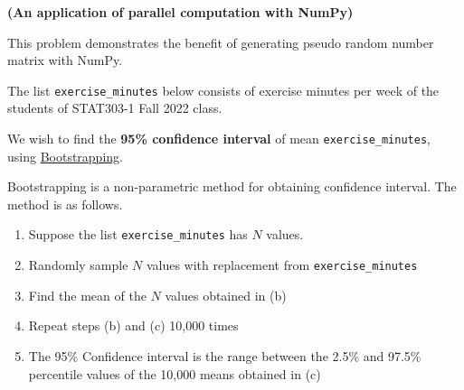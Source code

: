 \documentclass[
  letterpaper,
  DIV=11,
  numbers=noendperiod]{scrreprt}
\begin{document}
\textbf{(An application of parallel computation with NumPy)}

This problem demonstrates the benefit of generating pseudo random number
matrix with NumPy.

The list \texttt{exercise\_minutes} below consists of exercise minutes
per week of the students of STAT303-1 Fall 2022 class.

We wish to find the \textbf{95\% confidence interval} of mean
\texttt{exercise\_minutes}, using
\href{https://en.wikipedia.org/wiki/Bootstrapping_(statistics)}{Bootstrapping}.

Bootstrapping is a non-parametric method for obtaining confidence
interval. The method is as follows.

\begin{enumerate}
\def\labelenumi{(\alph{enumi})}
\item
  Suppose the list \texttt{exercise\_minutes} has \(N\) values.
\item
  Randomly sample \(N\) values with replacement from
  \texttt{exercise\_minutes}
\item
  Find the mean of the \(N\) values obtained in (b)
\item
  Repeat steps (b) and (c) 10,000 times
\item
  The 95\% Confidence interval is the range between the 2.5\% and 97.5\%
  percentile values of the 10,000 means obtained in (c)
\end{enumerate}
\end{document}
